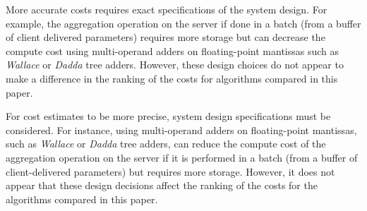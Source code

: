 \documentclass[runningheads]{llncs}
\def\tableref#1{Table~\ref{#1}}
\newcommand{\scaffold}{\textsc{SCAFFOLD}\xspace}
\newcommand{\feddyn}{\textsc{FedDyn}\xspace}
\newcommand{\ours}{\textsc{AdaBest}\xspace}
\begin{document}


More accurate costs requires exact specifications of the system design. For example, the aggregation operation on the server if done in a batch (from a buffer of client delivered parameters) requires more storage but can decrease the compute cost using multi-operand adders on floating-point mantissas such as \emph{Wallace} or \emph{Dadda} tree adders. However, these design choices do not appear to make a difference in the ranking of the costs for algorithms compared in this paper. 

For cost estimates to be more precise, system design specifications must be considered. For instance, using multi-operand adders on floating-point mantissas, such as \emph{Wallace} or \emph{Dadda} tree adders, can reduce the compute cost of the aggregation operation on the server if it is performed in a batch (from a buffer of client-delivered parameters) but requires more storage. However, it does not appear that these design decisions affect the ranking of the costs for the algorithms compared in this paper.
\end{document}
